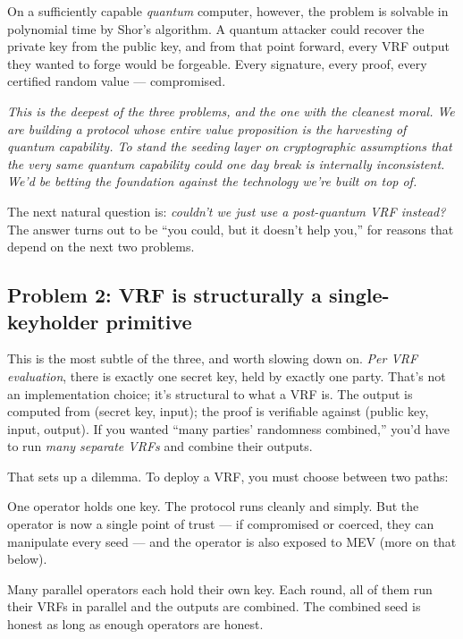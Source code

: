 \documentclass[11pt]{article}
\newenvironment{aside}{\par\medskip\noindent\itshape\small\color{black!70}}{\normalfont\par\medskip}
\begin{document}
On a sufficiently capable \emph{quantum} computer, however, the problem is solvable in polynomial time by Shor's algorithm. A quantum attacker could recover the private key from the public key, and from that point forward, every VRF output they wanted to forge would be forgeable. Every signature, every proof, every certified random value --- compromised.

\begin{aside}
This is the deepest of the three problems, and the one with the cleanest moral. We are building a protocol whose \emph{entire value proposition} is the harvesting of quantum capability. To stand the seeding layer on cryptographic assumptions that the very same quantum capability could one day break is internally inconsistent. We'd be betting the foundation against the technology we're built on top of.
\end{aside}

The next natural question is: \emph{couldn't we just use a post-quantum VRF instead?} The answer turns out to be ``you could, but it doesn't help you,'' for reasons that depend on the next two problems.

\subsection*{Problem 2: VRF is structurally a single-keyholder primitive}

This is the most subtle of the three, and worth slowing down on. \emph{Per VRF evaluation}, there is exactly one secret key, held by exactly one party. That's not an implementation choice; it's structural to what a VRF is. The output is computed from (secret key, input); the proof is verifiable against (public key, input, output). If you wanted ``many parties' randomness combined,'' you'd have to run \emph{many separate VRFs} and combine their outputs.

That sets up a dilemma. To deploy a VRF, you must choose between two paths:

\begin{description}[leftmargin=0pt, itemsep=4pt]
\item[Path A (centralised):] One operator holds one key. The protocol runs cleanly and simply. But the operator is now a single point of trust --- if compromised or coerced, they can manipulate every seed --- and the operator is also exposed to MEV (more on that below).
\item[Path B (decentralised):] Many parallel operators each hold their own key. Each round, all of them run their VRFs in parallel and the outputs are combined. The combined seed is honest as long as enough operators are honest.
\end{description}
\end{document}
